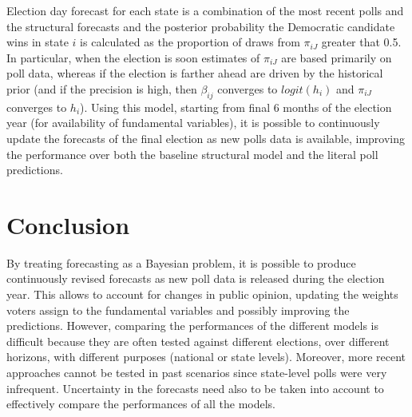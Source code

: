 \documentclass[
  12pt]{article}
\begin{document}
Election day forecast for each state is a combination of the most recent
polls and the structural forecasts and the posterior probability the
Democratic candidate wins in state \(i\) is calculated as the proportion
of draws from \(\pi_{iJ}\) greater that 0.5. In particular, when the
election is soon estimates of \(\pi_{iJ}\) are based primarily on poll
data, whereas if the election is farther ahead are driven by the
historical prior (and if the precision is high, then \(\beta_{ij}\)
converges to \(logit(h_i)\) and \(\pi_{iJ}\) converges to \(h_i\)).
Using this model, starting from final 6 months of the election year (for
availability of fundamental variables), it is possible to continuously
update the forecasts of the final election as new polls data is
available, improving the performance over both the baseline structural
model and the literal poll predictions.

\hypertarget{sec-conc}{%
\section{Conclusion}\label{sec-conc}}

By treating forecasting as a Bayesian problem, it is possible to produce
continuously revised forecasts as new poll data is released during the
election year. This allows to account for changes in public opinion,
updating the weights voters assign to the fundamental variables and
possibly improving the predictions. However, comparing the performances
of the different models is difficult because they are often tested
against different elections, over different horizons, with different
purposes (national or state levels). Moreover, more recent approaches
cannot be tested in past scenarios since state-level polls were very
infrequent. Uncertainty in the forecasts need also to be taken into
account to effectively compare the performances of all the models.
\end{document}
